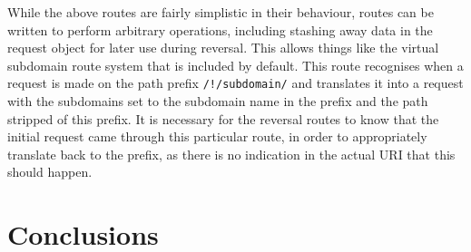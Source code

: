 \documentclass{sig-alternate-05-2015}
\begin{document}
While the above routes are fairly simplistic in their behaviour, routes can be written to perform arbitrary operations, including stashing away data in the request object for later use during reversal. This allows things like the virtual subdomain route system that is included by default. This route recognises when a request is made on the path prefix \texttt{/!/subdomain/} and translates it into a request with the subdomains set to the subdomain name in the prefix and the path stripped of this prefix. It is necessary for the reversal routes to know that the initial request came through this particular route, in order to appropriately translate back to the prefix, as there is no indication in the actual URI that this should happen. \\

\section{Conclusions}


%
\end{document}
